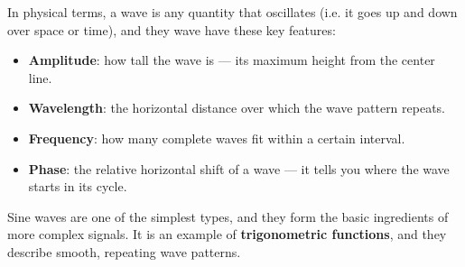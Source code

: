 In physical terms, a wave is any quantity that oscillates (i.e. it goes up and down over space or time), and they wave have these key features:

\begin{itemize}
  \item \textbf{Amplitude}: how tall the wave is — its maximum height from the center line.
  \item \textbf{Wavelength}: the horizontal distance over which the wave pattern repeats.
  \item \textbf{Frequency}: how many complete waves fit within a certain interval.
  \item \textbf{Phase}: the relative horizontal shift of a wave — it tells you where the wave starts in its cycle.
\end{itemize}

Sine waves are one of the simplest types, and they form the basic ingredients of more complex signals. It is an example of \textbf{trigonometric functions}, and they describe smooth, repeating wave patterns.

